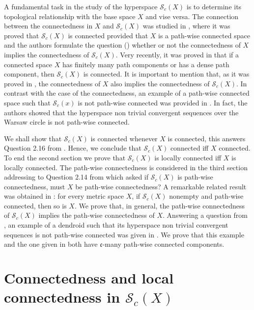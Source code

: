 \documentclass[11pt]{amsart}
\numberwithin{equation}{section}
\theoremstyle{plain}
\theoremstyle{definition}
\theoremstyle{definition}
\theoremstyle{definition}
\theoremstyle{definition}
\theoremstyle{definition}
\begin{document}
A fundamental task in the study of the hyperspace $\mathcal{S}_c(X)$ is to determine its topological relationship with  the base space $X$ and vise versa.
The connection  between the connectedness in $X$ and $\mathcal{S}_c(X)$  was studied in \cite{sal-yas}, where it was proved that $\mathcal{S}_c(X)$ is connected provided that $X$ is a path-wise connected space and the authors formulate the question (\cite[Q. 2.16]{sal-yas}) whether or not  the connectedness of $X$ implies the connectedness of $\mathcal{S}_c(X)$. Very recently, it was proved in \cite{may-pat-rob}  that if a connected space $X$ has finitely many path components or has a dense path component, then $\mathcal{S}_c(X)$ is connected. It is important to mention that, as it was proved in \cite{may-pat-rob}, the connectedness of $X$ also implies the connectedness of $\mathcal{S}_c(X)$. In contrast with the case of the connectedness, an example of a path-wise connected space such that $\mathcal{S}_c(x)$ is not path-wise connected was provided in \cite{sal-yas}. In fact, the authors showed that  the hyperspace non trivial convergent sequences over the Warsaw circle is not path-wise connected.

\medskip

 We shall show that $\mathcal{S}_c(X)$ is connected whenever $X$ is connected, this answers Question 2.16 from \cite{sal-yas}. Hence, we conclude that  $\mathcal{S}_c(X)$ connected iff $X$ connected. To end the second section we prove that $\mathcal{S}_c(X)$ is locally connected iff $X$ is locally connected.
The path-wise connectedness is considered in the third section addressing to  Question 2.14 from \cite{sal-yas} which asked
  if $\mathcal{S}_c(X)$ is path-wise connectedness, must $X$ be  path-wise connectedness? A remarkable related result was obtained in \cite{may-pat-rob}: for every metric space $X$, if $\mathcal{S}_c(X)$ nonempty and path-wise connected, then so is $X$. We prove that, in general, the path-wise connectedness of $\mathcal{S}_c(X)$ implies the path-wise connectedness of $X$.
  Answering a question from \cite[Q. 2.9]{sal-yas}, an example of a dendroid such that its hyperspace non trivial convergent sequences  is not path-wise connected was given in  \cite{may-pat-rob}. We prove that this example and the one given in \cite[Ex. 2.8]{sal-yas} both have $\mathfrak{c}$-many path-wise connected components.

\section{Connectedness and local connectedness in $\mathcal{S}_c(X)$}
\end{document}
